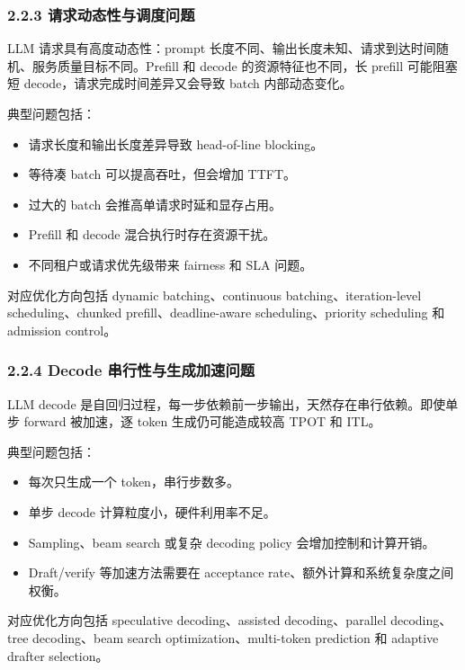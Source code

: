 \documentclass[a4paper,10pt]{ctexart}
\begin{document}
\subsubsection*{2.2.3 请求动态性与调度问题}

LLM 请求具有高度动态性：prompt 长度不同、输出长度未知、请求到达时间随机、服务质量目标不同。Prefill 和 decode 的资源特征也不同，长 prefill 可能阻塞短 decode，请求完成时间差异又会导致 batch 内部动态变化。


典型问题包括：


\begin{itemize}
\item 请求长度和输出长度差异导致 head-of-line blocking。

\item 等待凑 batch 可以提高吞吐，但会增加 TTFT。

\item 过大的 batch 会推高单请求时延和显存占用。

\item Prefill 和 decode 混合执行时存在资源干扰。

\item 不同租户或请求优先级带来 fairness 和 SLA 问题。

\end{itemize}
对应优化方向包括 dynamic batching、continuous batching、iteration-level scheduling、chunked prefill、deadline-aware scheduling、priority scheduling 和 admission control。




\subsubsection*{2.2.4 Decode 串行性与生成加速问题}

LLM decode 是自回归过程，每一步依赖前一步输出，天然存在串行依赖。即使单步 forward 被加速，逐 token 生成仍可能造成较高 TPOT 和 ITL。


典型问题包括：


\begin{itemize}
\item 每次只生成一个 token，串行步数多。

\item 单步 decode 计算粒度小，硬件利用率不足。

\item Sampling、beam search 或复杂 decoding policy 会增加控制和计算开销。

\item Draft/verify 等加速方法需要在 acceptance rate、额外计算和系统复杂度之间权衡。

\end{itemize}
对应优化方向包括 speculative decoding、assisted decoding、parallel decoding、tree decoding、beam search optimization、multi-token prediction 和 adaptive drafter selection。
\end{document}
